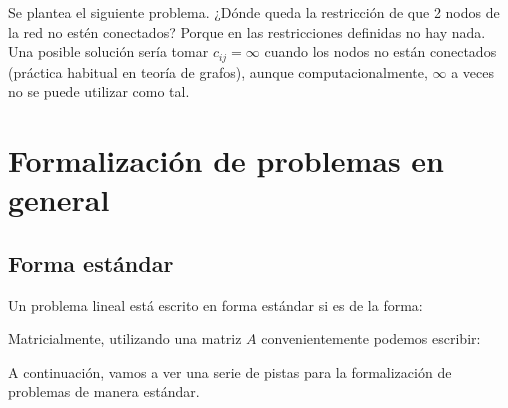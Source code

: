 Se plantea el siguiente problema. ¿Dónde queda la restricción de que 2 nodos de la red no estén conectados? Porque en las restricciones definidas no hay nada. 
Una posible solución sería tomar $c_{ij} = \infty$ cuando los nodos no están conectados (práctica habitual en teoría de grafos), aunque computacionalmente, $\infty$ a veces no se puede utilizar como tal. 


\section{Formalización de problemas en general}

\subsection{Forma estándar}

\begin{defn}
Un problema lineal está escrito en forma estándar si es de la forma:
\begin{ioprob}
\end{ioprob}

Matricialmente, utilizando una matriz $A$ convenientemente podemos escribir:

\begin{ioprob}
\end{ioprob}

\end{defn}

A continuación, vamos a ver una serie de pistas para la formalización de problemas de manera estándar.


